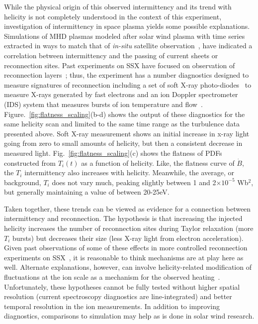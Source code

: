 \documentclass[aps,prl,amsmath,amssymb,reprint,superscriptaddress]{revtex4-1} %
\begin{document}
While the physical origin of this observed intermittency and its trend with helicity is not completely understood in the context of this experiment, investigation of intermittency in space plasma yields some possible explanations. Simulations of MHD plasmas modeled after solar wind plasma with time series extracted in ways to match that of \textit{in-situ} satellite observation~\cite{Greco08,Greco09}, have indicated a correlation between intermittency and the passing of current sheets or reconnection sites. Past experiments on SSX have focused on observation of reconnection layers~\cite{Gray10,brown12}; thus, the experiment has a number diagnostics designed to measure signatures of reconnection including a set of soft X-ray photo-diodes~\cite{chaplin09} to measure X-rays generated by fast electrons and an ion Doppler spectrometer (IDS) system that measures bursts of ion temperature and flow~\cite{brown12}. Figure.~\ref{fig:flatness_scaling}(b-d) shows the output of these diagnostics for the same helicity scan and limited to the same time range as the turbulence data presented above. Soft X-ray measurement shows an initial increase in x-ray light going from zero to small amounts of helicity, but then a consistent decrease in measured light. Fig.~\ref{fig:flatness_scaling}(c) shows the flatness of PDFs constructed from $T_{i}(t)$ as a function of helicity. Like, the flatness curve of $\dot{B}$, the $T_{i}$ intermittency also increases with helicity. Meanwhile, the average, or background, $T_{i}$ does not vary much, peaking slightly between 1 and 2$\times 10^{-5}$ Wb$^{2}$, but generally maintaining a value of between 20-25eV. 

Taken together, these trends can be viewed as evidence for a connection between intermittency and reconnection. The hypothesis is that increasing the injected helicity increases the number of reconnection sites during Taylor relaxation (more $T_{i}$ bursts) but decreases their size (less X-ray light from electron acceleration). Given past observations of some of these effects in more controlled reconnection experiments on SSX~\cite{brown12}, it is reasonable to think mechanisms are at play here as well. Alternate explanations, however, can involve helicity-related modification of fluctuations at the ion scale as a mechanism for the observed heating~\cite{wu13,osman11}. Unfortunately, these hypotheses cannot be fully tested without higher spatial resolution (current spectroscopy diagnostics are line-integrated) and better temporal resolution in the ion measurements. In addition to improving diagnostics, comparisons to simulation may help as is done in solar wind research.
\end{document}
